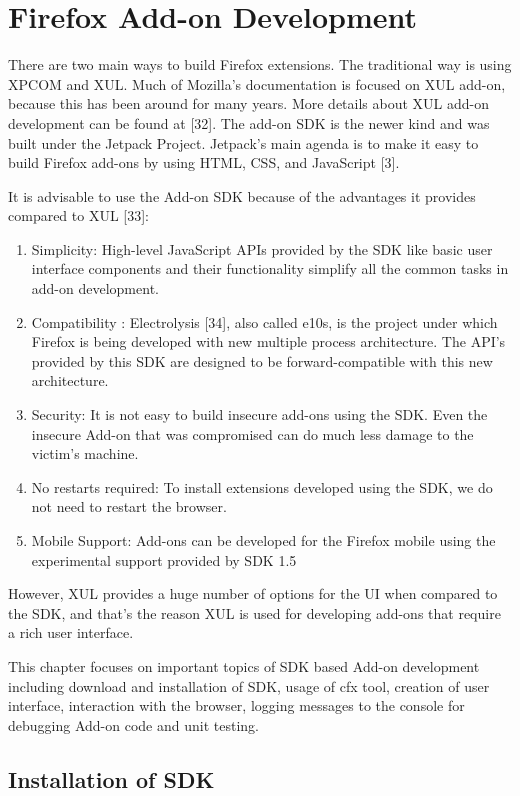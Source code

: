 \chapter{Firefox Add-on Development}

There are two main ways to build Firefox extensions. The traditional way is using XPCOM and XUL. Much of Mozilla's documentation is focused on XUL add-on, because this has been around for many years. More details about XUL add-on development can be found at [32]. The add-on SDK is the newer kind and was built under the Jetpack Project. Jetpack's main agenda is to make it easy to build Firefox add-ons by using HTML, CSS, and JavaScript [3].

It is advisable to use the Add-on SDK because of the advantages it provides compared to XUL [33]:

\begin{enumerate}
\item Simplicity: High-level JavaScript APIs provided by the SDK like basic user interface components and their functionality simplify all the common tasks in add-on development. 
\item Compatibility : Electrolysis [34], also called e10s, is the project under which Firefox is being developed with new multiple process architecture. The API's provided by this SDK are designed to be forward-compatible with this new architecture. 
\item Security: It is not easy to build insecure add-ons using the SDK. Even the insecure Add-on that was compromised can do much less damage to the victim's machine.
\item No restarts required: To install extensions developed using the SDK, we do not need to restart the browser.
\item Mobile Support: Add-ons can be developed for the Firefox mobile using the experimental support provided by SDK 1.5
\end{enumerate}

However, XUL provides a huge number of options for the UI when compared to the SDK, and that's the reason XUL is used for developing add-ons that require a rich user interface.

This chapter focuses on important topics of SDK based Add-on development including download and installation of SDK, usage of cfx tool, creation of user interface, interaction with the browser, logging messages to the console for debugging Add-on code and unit testing.

\section{Installation of SDK}

